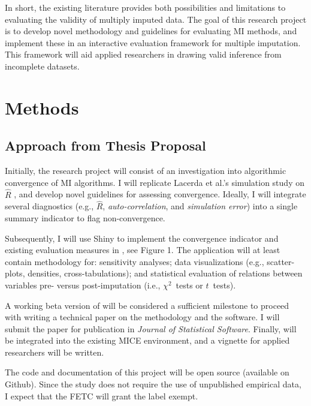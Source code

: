 \documentclass[article]{jss}
\begin{document}
In short, the existing literature provides both possibilities and limitations to evaluating the validity of multiply imputed data. The goal of this research project is to develop novel methodology and guidelines for evaluating MI methods, and implement these in an interactive evaluation framework for multiple imputation. This framework will aid applied researchers in drawing valid inference from incomplete datasets. 




\section{Methods} \label{sec:methods}

\subsection{Approach from Thesis Proposal}

Initially, the research project will consist of an investigation into algorithmic convergence of MI algorithms. I will replicate Lacerda et al.'s simulation study on $\widehat{R}$ \citep{lace07}, and develop novel guidelines for assessing convergence. Ideally, I will integrate several diagnostics (e.g., $\widehat{R}$, \emph{auto-correlation}, and \emph{simulation error}) into a single summary indicator to flag non-convergence. 

Subsequently, I will use  Shiny \citep{shiny} to implement the convergence indicator and existing evaluation measures in , see Figure 1. The application will at least contain methodology for: sensitivity analyses; data visualizations (e.g., scatter-plots, densities, cross-tabulations); and statistical evaluation of relations between variables pre- versus post-imputation (i.e., $\chi^2$~tests or $t$~tests).

A working beta version of  will be considered a sufficient milestone to proceed with writing a technical paper on the methodology and the software. I will submit the paper for publication in \emph{Journal of Statistical Software}. Finally,  will be integrated into the existing MICE environment, and a vignette for applied researchers will be written. 

The  code and documentation of this project will be open source (available on Github). Since the study does not require the use of unpublished empirical data, I expect that the FETC will grant the label exempt. 
\end{document}

